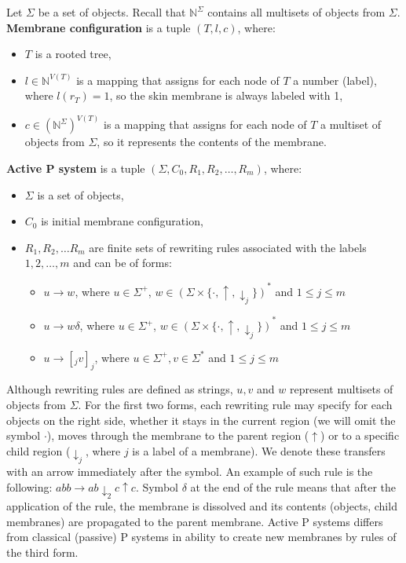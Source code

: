 Let $\Sigma$ be a set of objects. Recall that $\mathbb N^\Sigma$ contains all multisets of objects from $\Sigma$. {\bf Membrane configuration} is a tuple $(T, l, c)$, where:
\begin{itemize}
  \item $T$ is a rooted tree,
  \item $l\in\mathbb N^{V(T)}$ is a mapping that assigns for each node of $T$ a number (label), where $l(r_T)=1$, so the skin membrane is always labeled with 1,
  \item $c\in(\mathbb N^\Sigma)^{V(T)}$ is a mapping that assigns for each node of $T$ a multiset of objects from $\Sigma$, so it represents the contents of the membrane.
\end{itemize}

{\bf Active P system} is a tuple $(\Sigma, C_0, R_1, R_2, \dots , R_m)$, where:
\begin{itemize}
  \item $\Sigma$ is a set of objects,
  \item $C_0$ is initial membrane configuration,
  \item $R_1,R_2,\dots R_m$ are finite sets of rewriting rules associated with the labels $1,2,\dots,m$ and can be of forms:
  \begin{itemize}
    \item $u\rightarrow w$, where $u\in \Sigma^+$, $w\in (\Sigma\times\{\cdot, \uparrow, \downarrow_j\})^*$ and $1\leq j\leq m$
    \item $u\rightarrow w\delta$, where $u\in \Sigma^+$, $w\in (\Sigma\times\{\cdot, \uparrow, \downarrow_j\})^*$ and $1\leq j\leq m$
    \item $u\rightarrow [_j v]_j$, where $u\in \Sigma^+, v\in \Sigma^*$ and $1\leq j\leq m$
  \end{itemize}
\end{itemize}

Although rewriting rules are defined as strings, $u,v$ and $w$ represent multisets of objects from $\Sigma$. For the first two forms, each rewriting rule may specify for each objects on the right side, whether it stays in the current region (we will omit the symbol $\cdot$), moves through the membrane to the parent region ($\uparrow$)
or to a specific child region ($\downarrow_j$, where $j$ is a label of a membrane).
We denote these transfers with an arrow immediately after the symbol.
An example of such rule is the following: $abb\rightarrow ab\downarrow_2 c\uparrow c$.
Symbol $\delta$ at the end of the rule means that after the application of the rule, the membrane is dissolved and its contents (objects, child membranes) are propagated to the parent membrane.
Active P systems differs from classical (passive) P systems in ability to create new membranes by rules of the third form.

